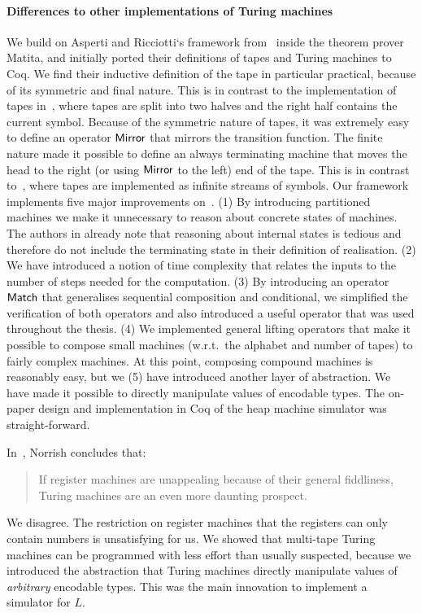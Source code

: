 \paragraph{Differences to other implementations of Turing machines}
We build on Asperti and Ricciotti`s framework from~\cite{asperti2015} inside the theorem prover Matita, and initially ported their definitions of
tapes and Turing machines to Coq.  We find their inductive definition of the tape in particular practical, because of its symmetric and final nature.
This is in contrast to the implementation of tapes in~\cite{xu2013}, where tapes are split into two halves and the right half contains the current
symbol.  Because of the symmetric nature of tapes, it was extremely easy to define an operator $\mathsf{Mirror}$ that mirrors the transition function.
The finite nature made it possible to define an always terminating machine that moves the head to the right (or using $\mathsf{Mirror}$ to the left) end
of the tape.  This is in contrast to~\cite{ciaffaglione2016}, where tapes are implemented as infinite streams of symbols.  Our framework implements
five major improvements on~\cite{asperti2015}.  (1) By introducing partitioned machines we make it unnecessary to reason about concrete states of
machines.  The authors in \cite{asperti2015} already note that reasoning about internal states is tedious and therefore do not include the terminating
state in their definition of realisation.  (2) We have introduced a notion of time complexity that relates the inputs to the number of steps needed
for the computation.  (3) By introducing an operator $\mathsf{Match}$ that generalises sequential composition and conditional, we simplified the
verification of both operators and also introduced a useful operator that was used throughout the thesis.  (4) We implemented general lifting
operators that make it possible to compose small machines (w.r.t.\ the alphabet and number of tapes) to fairly complex machines.  At this point,
composing compound machines is reasonably easy, but we (5) have introduced another layer of abstraction.  We have made it possible to directly
manipulate values of encodable types.  The on-paper design and implementation in Coq of the heap machine simulator was straight-forward.


In~\cite{NorrishComputabilityTheory}, Norrish concludes that:
\begin{quote}
  If register machines are unappealing because of their general fiddliness, Turing machines are an even more daunting prospect.
\end{quote}
We disagree.  The restriction on register machines that the registers can only contain numbers is unsatisfying for us.  We showed that multi-tape
Turing machines can be programmed with less effort than usually suspected, because we introduced the abstraction that Turing machines directly
manipulate values of \textit{arbitrary} encodable types.  This was the main innovation to implement a simulator for $L$.


